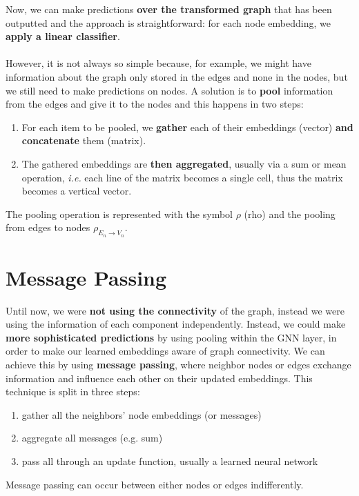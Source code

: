 \documentclass[oneside]{academica}
\begin{document}
Now, we can make predictions \textbf{over the transformed graph} that has been outputted and the approach is straightforward: for each node embedding, we \textbf{apply a linear classifier}.
\\\\
However, it is not always so simple because, for example, we might have information about the graph only stored in the edges and none in the nodes, but we still need to make predictions on nodes.
A solution is to \textbf{pool} information from the edges and give it to the nodes and this happens in two steps:
\begin{enumerate}
  \item For each item to be pooled, we \textbf{gather} each of their embeddings (vector) \textbf{and concatenate} them (matrix).
  \item The gathered embeddings are \textbf{then aggregated}, usually via a sum or mean operation, \textit{i.e.} each line of the matrix becomes a single cell, thus the matrix becomes a vertical vector.
\end{enumerate}
The pooling operation is represented with the symbol $\rho$ (rho) and the pooling from edges to nodes $\rho_{E_n \rightarrow V_n}$.

\section{Message Passing}

Until now, we were \textbf{not using the connectivity} of the graph, instead we were using the information of each component independently.
Instead, we could make \textbf{more sophisticated predictions} by using pooling within the GNN layer, in order to make our learned embeddings aware of graph connectivity.
We can achieve this by using \textbf{message passing}, where neighbor nodes or edges exchange information and influence each other on their updated embeddings.
This technique is split in three steps:
\begin{enumerate}
  \item gather all the neighbors' node embeddings (or messages)
  \item aggregate all messages (e.g. sum)
  \item pass all through an update function, usually a learned neural network
\end{enumerate}
Message passing can occur between either nodes or edges indifferently.

\newpage
\end{document}
